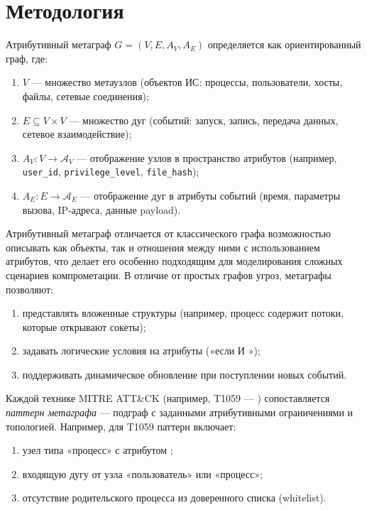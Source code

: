 \section*{Методология}

Атрибутивный метаграф $G = (V, E, A_V, A_E)$ определяется как ориентированный граф, где:
\begin{enumerate}
    \item $V$ — множество метаузлов (объектов ИС: процессы, пользователи, хосты, файлы, сетевые соединения);
    \item $E \subseteq V \times V$ — множество дуг (событий: запуск, запись, передача данных, сетевое взаимодействие);
    \item $A_V: V \to \mathcal{A}_V$ — отображение узлов в пространство атрибутов (например, \texttt{user\_id}, \texttt{privilege\_level}, \texttt{file\_hash});
    \item $A_E: E \to \mathcal{A}_E$ — отображение дуг в атрибуты событий (время, параметры вызова, IP-адреса, данные payload).
\end{enumerate}

\vspace{0.5em}
Атрибутивный метаграф отличается от классического графа возможностью описывать как объекты, так и отношения между ними с использованием атрибутов, что делает его особенно подходящим для моделирования сложных сценариев компрометации. В отличие от простых графов угроз, метаграфы позволяют:
\begin{enumerate}
    \item представлять вложенные структуры (например, процесс содержит потоки, которые открывают сокеты);
    \item задавать логические условия на атрибуты («если \texttt{} И \texttt{}»);
    \item поддерживать динамическое обновление при поступлении новых событий.
\end{enumerate}

Каждой технике MITRE ATT\&CK (например, T1059 — \textit{}) сопоставляется \textit{паттерн метаграфа} — подграф с заданными атрибутивными ограничениями и топологией. Например, для T1059 паттерн включает:
\begin{enumerate}
    \item узел типа «процесс» с атрибутом \texttt{};
    \item входящую дугу от узла «пользователь» или «процесс»;
    \item отсутствие родительского процесса из доверенного списка (whitelist).
\end{enumerate}

